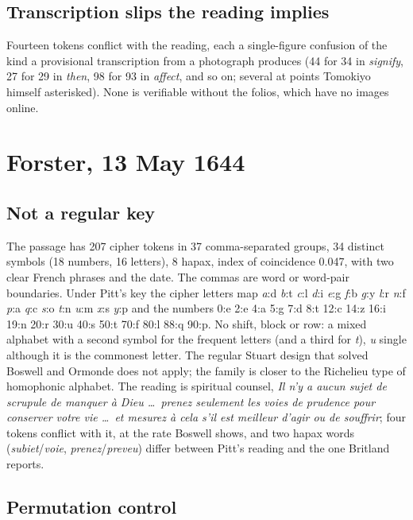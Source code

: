 \documentclass[11pt]{article}
\begin{document}
\subsection{Transcription slips the reading implies}

Fourteen tokens conflict with the reading, each a single-figure confusion of the kind a provisional transcription from a photograph produces (44 for 34 in \emph{signify}, 27 for 29 in \emph{then}, 98 for 93 in \emph{affect}, and so on; several at points Tomokiyo himself asterisked). None is verifiable without the folios, which have no images online.

\section{Forster, 13 May 1644}

\subsection{Not a regular key}

The passage has 207 cipher tokens in 37 comma-separated groups, 34 distinct symbols (18 numbers, 16 letters), 8 hapax, index of coincidence 0.047, with two clear French phrases and the date. The commas are word or word-pair boundaries. Under Pitt's key the cipher letters map \emph{a}:d \emph{b}:t \emph{c}:l \emph{d}:i \emph{e}:g \emph{f}:b \emph{g}:y \emph{l}:r \emph{n}:f \emph{p}:a \emph{q}:c \emph{s}:o \emph{t}:n \emph{u}:m \emph{x}:s \emph{y}:p and the numbers 0:e 2:e 4:a 5:g 7:d 8:t 12:c 14:z 16:i 19:n 20:r 30:u 40:s 50:t 70:f 80:l 88:q 90:p. No shift, block or row: a mixed alphabet with a second symbol for the frequent letters (and a third for \emph{t}), \emph{u} single although it is the commonest letter. The regular Stuart design that solved Boswell and Ormonde does not apply; the family is closer to the Richelieu type of homophonic alphabet. The reading is spiritual counsel, \emph{Il n'y a aucun sujet de scrupule de manquer \`a Dieu \ldots\ prenez seulement les voies de prudence pour conserver votre vie \ldots\ et mesurez \`a cela s'il est meilleur d'agir ou de souffrir}; four tokens conflict with it, at the rate Boswell shows, and two hapax words (\emph{subiet}/\emph{voie}, \emph{prenez}/\emph{preveu}) differ between Pitt's reading and the one Britland reports.

\subsection{Permutation control}
\end{document}
